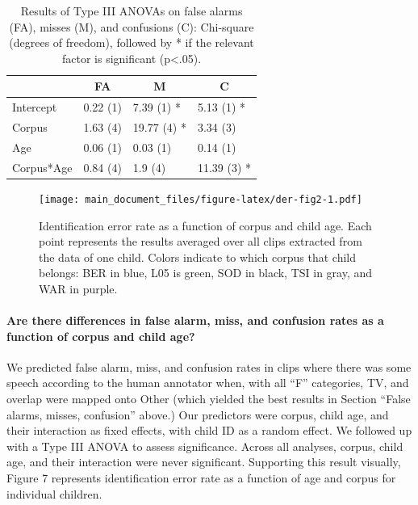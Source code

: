 \documentclass[english,table,man,floatsintext]{apa6}
\let\oldparagraph\paragraph
\renewcommand{\paragraph}[1]{\oldparagraph{#1}\mbox{}}
\begin{document}
\begin{table}[tbp]

\begin{center}
\begin{threeparttable}

\caption{\label{tab:anovatab}Results of Type III ANOVAs on false alarms (FA), misses (M), and confusions (C): Chi-square (degrees of freedom), followed by * if the relevant factor is significant (p<.05).}

\begin{tabular}{llll}
\toprule
 & \multicolumn{1}{c}{FA} & \multicolumn{1}{c}{M} & \multicolumn{1}{c}{C}\\
\midrule
Intercept & 0.22 (1) & 7.39 (1) * & 5.13 (1) *\\
Corpus & 1.63 (4) & 19.77 (4) * & 3.34 (3)\\
Age & 0.06 (1) & 0.03 (1) & 0.14 (1)\\
Corpus*Age & 0.84 (4) & 1.9 (4) & 11.39 (3) *\\
\bottomrule
\end{tabular}

\end{threeparttable}
\end{center}

\end{table}

\begin{figure}
\centering
\texttt{[image: main\_document\_files/figure-latex/der-fig2-1.pdf]}
\caption{\label{fig:der-fig2}Identification error rate as a function of corpus and child age. Each point represents the results averaged over all clips extracted from the data of one child. Colors indicate to which corpus that child belongs: BER in blue, L05 is green, SOD in black, TSI in gray, and WAR in purple.}
\end{figure}

\hypertarget{are-there-differences-in-false-alarm-miss-and-confusion-rates-as-a-function-of-corpus-and-child-age}{%
\paragraph{Are there differences in false alarm, miss, and confusion rates as a function of corpus and child age?}\label{are-there-differences-in-false-alarm-miss-and-confusion-rates-as-a-function-of-corpus-and-child-age}}

We predicted false alarm, miss, and confusion rates in clips where there was some speech according to the human annotator when, with all \enquote{F} categories, TV, and overlap were mapped onto Other (which yielded the best results in Section \enquote{False alarms, misses, confusion} above.) Our predictors were corpus, child age, and their interaction as fixed effects, with child ID as a random effect. We followed up with a Type III ANOVA to assess significance. Across all analyses, corpus, child age, and their interaction were never significant. Supporting this result visually, Figure 7 represents identification error rate as a function of age and corpus for individual children.
\end{document}
